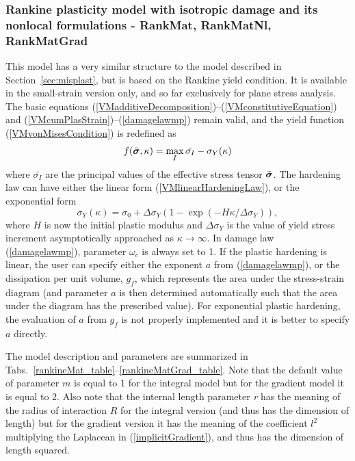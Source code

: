 \documentclass[a4paper]{article}
\newcommand{\mbf}[1]{\mbox{\boldmath$#1$}}
\newcommand{\param}[1]{{\it #1}}
\newcommand{\vsig}{\mbf{\sigma}}%
\begin{document}
\subsubsection{Rankine plasticity model with isotropic damage and its nonlocal formulations - RankMat, RankMatNl, RankMatGrad}
\label{sec:rankplast}

This model has a very similar structure to the model described in Section~\ref{sec:misplast},
but is based on the Rankine yield condition. It is available in the small-strain version
only, and so far exclusively for plane stress analysis. 
The basic equations (\ref{VMadditiveDecomposition})--(\ref{VMconstitutiveEquation}) 
and (\ref{VMcumPlasStrain})--(\ref{damagelawmp}) remain valid, 
and the yield function (\ref{VMvonMisesCondition}) is redefined as
\begin{equation}\label{RankineCondition}
f(\bar{\vsig},\kappa) = \max_{I}\bar{\sigma_I}-\sigma_Y(\kappa)
\end{equation}
where $\bar{\sigma_I}$ are the principal values of the effective stress tensor $\bar{\vsig}$.
The hardening law can have either the linear form (\ref{VMlinearHardeningLaw}), or the exponential form
\begin{equation}\label{VMexpHardeningLaw}
\sigma_Y(\kappa) = \sigma_0 + \Delta\sigma_Y\left(1-\exp(-H\kappa/\Delta\sigma_Y)\right),
\end{equation}
where $H$ is now the initial plastic modulus and $\Delta\sigma_Y$ is the value of yield stress
increment asymptotically approached as $\kappa\rightarrow\infty$.
In damage law (\ref{damagelawmp}), parameter $\omega_c$ is always set to 1.
If the plastic hardening is linear, the user can specify either the exponent $a$ from (\ref{damagelawmp}),
or the dissipation per unit volume, $g_f$, which represents the area under the
stress-strain diagram (and parameter $a$ is then determined automatically such that
the area under the diagram has the prescribed value).
For exponential plastic hardening, the evaluation of $a$ from $g_f$ is not properly
implemented and it is better to specify $a$ directly.

The model description and parameters are summarized in Tabs.~\ref{rankineMat_table}--\ref{rankineMatGrad_table}. Note that the default value of parameter $m$ is equal to 1 for the
integral model but for the gradient model it is equal to 2. 
Also note that the internal length parameter \param{r} has the meaning of the
radius of interaction $R$ for the integral version (and thus has the dimension
of length) but for the gradient version it has the meaning of the coefficient $l^2$
multiplying the Laplacean in (\ref{implicitGradient}), and thus has the dimension of length squared.
\end{document}

